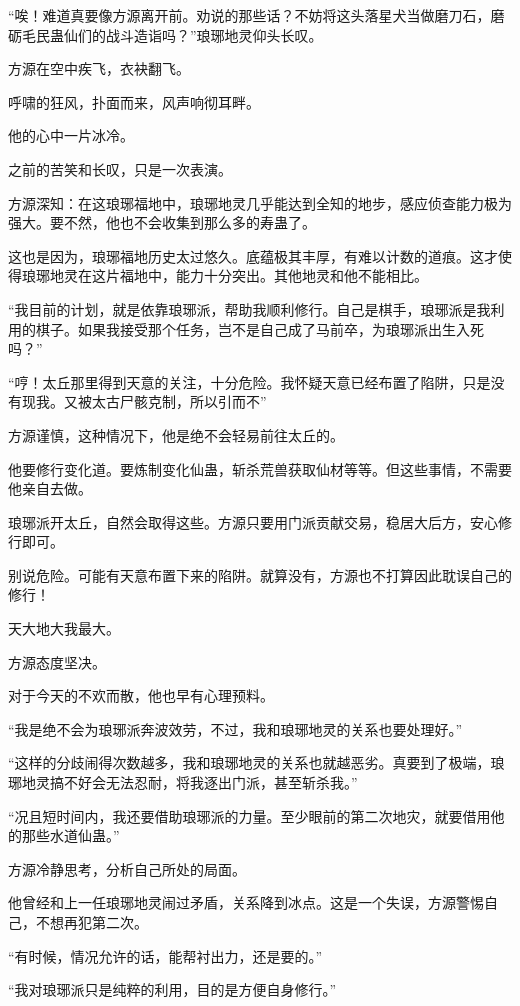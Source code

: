 \begin{this_body}
“唉！难道真要像方源离开前。劝说的那些话？不妨将这头落星犬当做磨刀石，磨砺毛民蛊仙们的战斗造诣吗？”琅琊地灵仰头长叹。

方源在空中疾飞，衣袂翻飞。

呼啸的狂风，扑面而来，风声响彻耳畔。

他的心中一片冰冷。

之前的苦笑和长叹，只是一次表演。

方源深知：在这琅琊福地中，琅琊地灵几乎能达到全知的地步，感应侦查能力极为强大。要不然，他也不会收集到那么多的寿蛊了。

这也是因为，琅琊福地历史太过悠久。底蕴极其丰厚，有难以计数的道痕。这才使得琅琊地灵在这片福地中，能力十分突出。其他地灵和他不能相比。

“我目前的计划，就是依靠琅琊派，帮助我顺利修行。自己是棋手，琅琊派是我利用的棋子。如果我接受那个任务，岂不是自己成了马前卒，为琅琊派出生入死吗？”

“哼！太丘那里得到天意的关注，十分危险。我怀疑天意已经布置了陷阱，只是没有现我。又被太古尸骸克制，所以引而不”

方源谨慎，这种情况下，他是绝不会轻易前往太丘的。

他要修行变化道。要炼制变化仙蛊，斩杀荒兽获取仙材等等。但这些事情，不需要他亲自去做。

琅琊派开太丘，自然会取得这些。方源只要用门派贡献交易，稳居大后方，安心修行即可。

别说危险。可能有天意布置下来的陷阱。就算没有，方源也不打算因此耽误自己的修行！

天大地大我最大。

方源态度坚决。

对于今天的不欢而散，他也早有心理预料。

“我是绝不会为琅琊派奔波效劳，不过，我和琅琊地灵的关系也要处理好。”

“这样的分歧闹得次数越多，我和琅琊地灵的关系也就越恶劣。真要到了极端，琅琊地灵搞不好会无法忍耐，将我逐出门派，甚至斩杀我。”

“况且短时间内，我还要借助琅琊派的力量。至少眼前的第二次地灾，就要借用他的那些水道仙蛊。”

方源冷静思考，分析自己所处的局面。

他曾经和上一任琅琊地灵闹过矛盾，关系降到冰点。这是一个失误，方源警惕自己，不想再犯第二次。

“有时候，情况允许的话，能帮衬出力，还是要的。”

“我对琅琊派只是纯粹的利用，目的是方便自身修行。”


\end{this_body}
